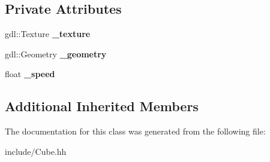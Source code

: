 \subsection*{Private Attributes}
\begin{DoxyCompactItemize}
\item 
\hypertarget{class_cube_ae78f74de5d85c7a4ca95282dd49c4766}{}gdl\+::\+Texture {\bfseries \+\_\+texture}\label{class_cube_ae78f74de5d85c7a4ca95282dd49c4766}

\item 
\hypertarget{class_cube_ab59ab7679c60281cb5d1c1c6fba679b1}{}gdl\+::\+Geometry {\bfseries \+\_\+geometry}\label{class_cube_ab59ab7679c60281cb5d1c1c6fba679b1}

\item 
\hypertarget{class_cube_a4cf45f6a2ed57e0cb4c6830f410e945e}{}float {\bfseries \+\_\+speed}\label{class_cube_a4cf45f6a2ed57e0cb4c6830f410e945e}

\end{DoxyCompactItemize}
\subsection*{Additional Inherited Members}


The documentation for this class was generated from the following file\+:\begin{DoxyCompactItemize}
\item 
include/Cube.\+hh\end{DoxyCompactItemize}
